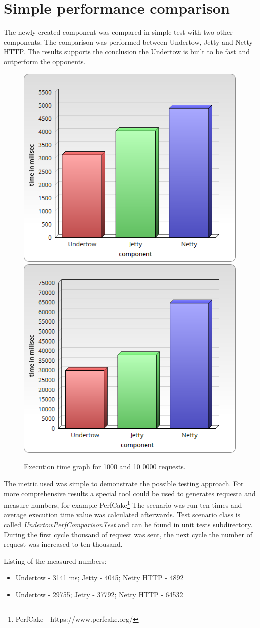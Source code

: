 \documentclass[12pt,final,oneside]{fithesis2}
\begin{document}
\section{Simple performance comparison}
The newly created component was compared in simple test with two other components. The comparison was performed between Undertow, Jetty and Netty HTTP. The results supports the conclusion the Undertow is built to be fast and outperform the opponents.

\begin{figure}[ht]
\centering
\includegraphics[width=0.49\linewidth]{images/1K.png}
\includegraphics[width=0.49\linewidth]{images/10K.png}
\caption{Execution time graph for 1000 and 10 0000 requests.}
\end{figure}

The metric used was simple to demonstrate the possible testing approach. For more comprehensive results a special tool could be used to generates requesta and measure numbers, for example PerfCake\footnote{PerfCake - https://www.perfcake.org/}
 The scenario was run ten times and average execution time value was calculated afterwards. Test scenario class is called \textit{UndertowPerfComparisonTest} and can be found in unit tests subdirectory. During the first cycle thousand of request was sent, the next cycle the number of request was increased to ten thousand.

Listing of the measured numbers:
\begin{itemize}
\item Undertow - 3141 ms; Jetty - 4045; Netty HTTP -  4892
\item Undertow - 29755; Jetty - 37792; Netty HTTP - 64532
\end{itemize}
\end{document}
